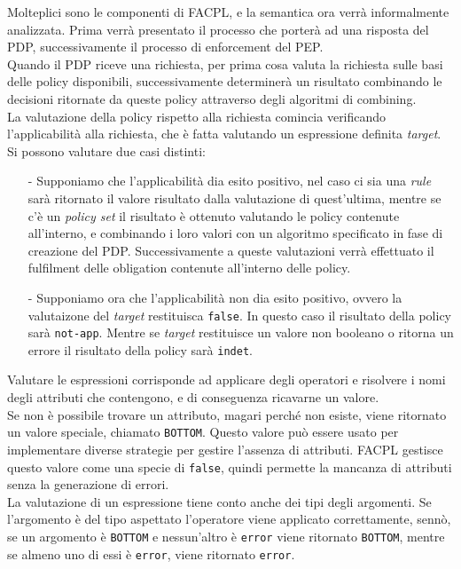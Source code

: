 Molteplici sono le componenti di FACPL, e la semantica ora verrà informalmente analizzata.\cite{fullfacpl}
Prima verrà presentato il processo che porterà ad una risposta del PDP, successivamente il processo di enforcement del PEP.\\
Quando il PDP riceve una richiesta, per prima cosa valuta la richiesta sulle basi delle policy disponibili, successivamente determinerà un risultato combinando le decisioni ritornate da queste policy attraverso degli algoritmi di combining.\\
La valutazione della policy rispetto alla richiesta comincia verificando l'applicabilità alla richiesta, che è fatta valutando un espressione definita \textit{target}.\\
Si possono valutare due casi distinti:
\begin{itemize}
\item[-] Supponiamo che l'applicabilità dia esito positivo, nel caso ci sia una \textit{rule} sarà ritornato il valore risultato dalla valutazione di quest'ultima, mentre se c'è un \textit{policy set} il risultato è ottenuto valutando le policy contenute all'interno, e combinando i loro valori con un algoritmo specificato in fase di creazione del PDP. Successivamente a queste valutazioni verrà effettuato il fulfilment delle obligation contenute all'interno delle policy.
\item[-] Supponiamo ora che l'applicabilità non dia esito positivo, ovvero la valutaizone del \textit{target} restituisca \texttt{false}. In questo caso il risultato della policy sarà \texttt{not-app}. Mentre se \textit{target} restituisce un valore non booleano o ritorna un errore il risultato della policy sarà \texttt{indet}.
\end{itemize}
Valutare le espressioni corrisponde ad applicare degli operatori e risolvere i nomi degli attributi che contengono, e di conseguenza ricavarne un valore.\\
Se non è possibile trovare un attributo, magari perché non esiste, viene ritornato un valore speciale, chiamato \texttt{BOTTOM}. Questo valore può essere usato per implementare diverse strategie per gestire l'assenza di attributi. FACPL gestisce questo valore come una specie di \texttt{false}, quindi permette la mancanza di attributi senza la generazione di errori.\\
La valutazione di un espressione tiene conto anche dei tipi degli argomenti. Se l'argomento è del tipo aspettato l'operatore viene applicato correttamente, sennò, se un argomento è \texttt{BOTTOM} e nessun'altro è \texttt{error} viene ritornato \texttt{BOTTOM}, mentre se almeno uno di essi è \texttt{error}, viene ritornato \texttt{error}.\\
